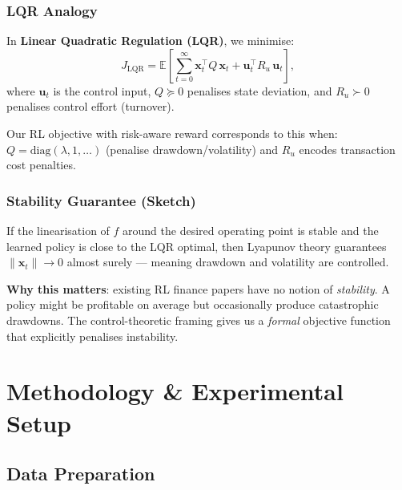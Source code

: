 \documentclass[12pt,a4paper]{article}
\begin{document}
\subsubsection*{LQR Analogy}

In \textbf{Linear Quadratic Regulation (LQR)}, we minimise:
\begin{equation}
  J_{\text{LQR}} = \mathbb{E}\!\left[
    \sum_{t=0}^\infty \mathbf{x}_t^\top Q\, \mathbf{x}_t
    + \mathbf{u}_t^\top R_u\, \mathbf{u}_t
  \right],
\end{equation}
where $\mathbf{u}_t$ is the control input, $Q \succeq 0$ penalises
state deviation, and $R_u \succ 0$ penalises control effort (turnover).

Our RL objective with risk-aware reward corresponds to this when:
$Q = \text{diag}(\lambda, 1, \ldots)$ (penalise drawdown/volatility) and
$R_u$ encodes transaction cost penalties.

\subsubsection*{Stability Guarantee (Sketch)}

If the linearisation of $f$ around the desired operating point is stable
and the learned policy is close to the LQR optimal, then Lyapunov theory
guarantees $\|\mathbf{x}_t\| \to 0$ almost surely --- meaning drawdown and
volatility are controlled.

\begin{contribbox}
\textbf{Why this matters}: existing RL finance papers have no notion of
\emph{stability}.  A policy might be profitable on average but occasionally
produce catastrophic drawdowns.  The control-theoretic framing gives us a
\emph{formal} objective function that explicitly penalises instability.
\end{contribbox}

\section{Methodology \& Experimental Setup}

\subsection{Data Preparation}
\end{document}
